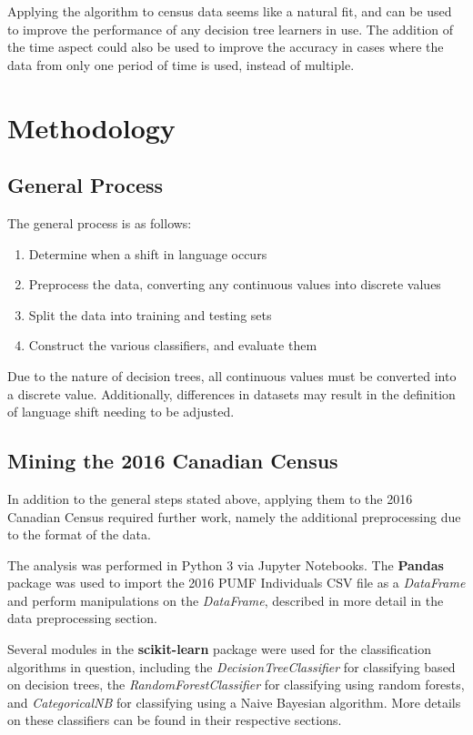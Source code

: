 \documentclass[10pt, conference, compsocconf]{IEEEtran}
\begin{document}
Applying the algorithm to census data seems like a natural fit, and can be used to improve the performance of any decision tree learners in use. The addition of the time aspect could also be used to improve the accuracy in cases where the data from only one period of time is used, instead of multiple.


\section{Methodology}

\subsection{General Process}
The general process is as follows:
\begin{enumerate}
	\item Determine when a shift in language occurs
	\item Preprocess the data, converting any continuous values into discrete values
	\item Split the data into training and testing sets
	\item Construct the various classifiers, and evaluate them
\end{enumerate}

Due to the nature of decision trees, all continuous values must be converted into a discrete value. Additionally, differences in datasets may result in the definition of language shift needing to be adjusted.

\subsection{Mining the 2016 Canadian Census}
In addition to the general steps stated above, applying them to the 2016 Canadian Census required further work, namely the additional preprocessing due to the format of the data.

The analysis was performed in Python 3 via Jupyter Notebooks.  
The \textbf{Pandas} package was used to import the 2016 PUMF Individuals CSV file as a  \textit{DataFrame} and perform manipulations on the \textit{DataFrame}, described in more detail in the data preprocessing section.

Several modules in the \textbf{scikit-learn} package were used for the classification algorithms in question, including the \textit{DecisionTreeClassifier} for classifying based on decision trees, the \textit{RandomForestClassifier} for classifying using random forests, and \textit{CategoricalNB} for classifying using a Naive Bayesian algorithm. More details on these classifiers can be found in their respective sections.
\end{document}
